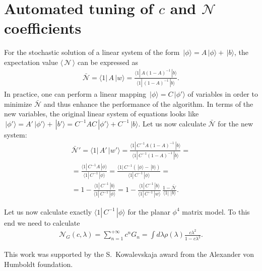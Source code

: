 \documentclass[twocolumn,showpacs,preprintnumbers,superscriptaddress,amsmath,floatfix,amssymb,secnumarabic]{revtex4}
\newcommand{\lr}[1]{ \left( #1 \right) }
\newcommand{\vev}[1]{ \langle \, #1 \, \rangle }
\newcommand{\ket}[1]{ \, | #1 \rangle }
\newcommand{\bra}[1]{ \langle #1 | \, }
\begin{document}
\section{Automated tuning of $c$ and $\mathcal{N}$ coefficients}

 For the stochastic solution of a linear system of the form $\ket{\phi} = A \ket{\phi} + \ket{b}$, the expectation value $\vev{\mathcal{N}}$ can be expressed as
\begin{eqnarray}
\label{mean_nA}
 \bar{\mathcal{N}} = \bra{1} A \ket{w} = \frac{\bra{1} A \lr{1 - A}^{-1} \ket{b}}{\bra{1} \lr{1 - A}^{-1} \ket{b}} .
\end{eqnarray}
In practice, one can perform a linear mapping $\ket{\phi} = C \ket{\phi'}$ of variables in order to minimize $\bar{\mathcal{N}}$ and thus enhance the performance of the algorithm. In terms of the new variables, the original linear system of equations looks like $\ket{\phi'} = A' \ket{\phi'} + \ket{b'} = C^{-1} A C \ket{\phi'} + C^{-1} \ket{b}$. Let us now calculate $\bar{\mathcal{N}}$ for the new system:
\begin{eqnarray}
\label{mean_nA_new}
 \bar{\mathcal{N}}' = \bra{1} A' \ket{w'}
 =
 \frac{\bra{1} C^{-1} A \lr{1 - A}^{-1} \ket{b}}{\bra{1} C^{-1} \lr{1 - A}^{-1} \ket{b}}
 = \nonumber \\ =
 \frac{\bra{1} C^{-1} A \ket{\phi}}{\bra{1} C^{-1} \ket{\phi}}
 =
 \frac{\bra{1} C^{-1} \lr{\ket{\phi} - \ket{b}} }{\bra{1} C^{-1} \ket{\phi}}
 = \nonumber \\ =
 1 - \frac{\bra{1} C^{-1} \ket{b}}{\bra{1} C^{-1} \ket{\phi}}
 =
 1 - \frac{\bra{1} C^{-1} \ket{b}}{\bra{1} C^{-1} \ket{w}} \, \frac{1 - \bar{\mathcal{N}}}{\bra{1}\ket{b}}.
\end{eqnarray}

 Let us now calculate exactly $\bra{1} C^{-1} \ket{\phi}$ for the planar $\phi^4$ matrix model. To this end we need to calculate
\begin{eqnarray}
\label{Gnorm_rescaled}
 \mathcal{N}_G\lr{c, \lambda} = \sum\limits_{n = 1}^{+\infty} c^n G_n =
 \int d\lambda \rho\lr{\lambda} \frac{c \lambda^2}{1 - c \lambda^2} .
\end{eqnarray}

\begin{acknowledgments}
 This work was supported by the S.~Kowalevskaja award from the Alexander von Humboldt foundation.
\end{acknowledgments}



\end{document}
